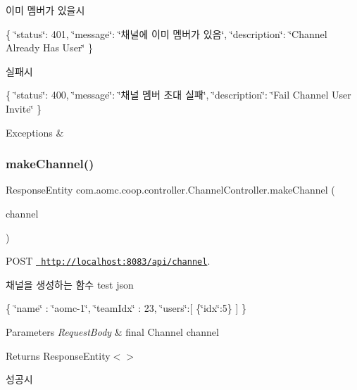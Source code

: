 이미 멤버가 있을시

\{ \char`\"{}status\char`\"{}\+: 401, \char`\"{}message\char`\"{}\+: \char`\"{}채널에 이미 멤버가 있음\char`\"{}, \char`\"{}description\char`\"{}\+: \char`\"{}\+Channel Already Has User\char`\"{} \}

실패시

\{ \char`\"{}status\char`\"{}\+: 400, \char`\"{}message\char`\"{}\+: \char`\"{}채널 멤버 초대 실패\char`\"{}, \char`\"{}description\char`\"{}\+: \char`\"{}\+Fail Channel User Invite\char`\"{} \}


\begin{DoxyExceptions}{Exceptions}
{\em } & \\
\hline
\end{DoxyExceptions}
\mbox{\label{classcom_1_1aomc_1_1coop_1_1controller_1_1_channel_controller_a6eec06a26ab08812025e22eb5e8005a9}} 
\subsubsection{\texorpdfstring{makeChannel()}{makeChannel()}}
{\footnotesize\ttfamily Response\+Entity com.\+aomc.\+coop.\+controller.\+Channel\+Controller.\+make\+Channel (\begin{DoxyParamCaption}\item[{@Request\+Body final Channel}]{channel }\end{DoxyParamCaption})}



P\+O\+ST \href{http://localhost:8083/api/channel}{\texttt{ http\+://localhost\+:8083/api/channel}}. 

채널을 생성하는 함수 test json

\{ \char`\"{}name\char`\"{} \+: \char`\"{}aomc-\/1\char`\"{}, \char`\"{}team\+Idx\char`\"{} \+: 23, \char`\"{}users\char`\"{}\+:\mbox{[} \{\char`\"{}idx\char`\"{}\+:5\} \mbox{]} \}


\begin{DoxyParams}{Parameters}
{\em Request\+Body} & final Channel channel\\
\hline
\end{DoxyParams}
\begin{DoxyReturn}{Returns}
Response\+Entity$<$$>$
\end{DoxyReturn}
성공시

